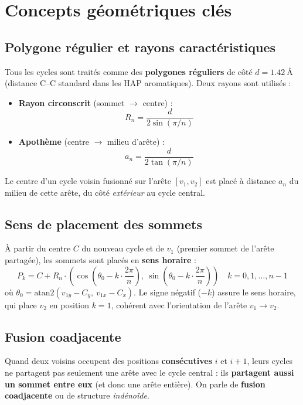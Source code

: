 \documentclass[a4paper,12pt]{article}
\begin{document}
\section{Concepts géométriques clés}

\subsection{Polygone régulier et rayons caractéristiques}

Tous les cycles sont traités comme des \textbf{polygones réguliers} de côté $d = 1.42\ \text{\AA}$
(distance C--C standard dans les HAP aromatiques). Deux rayons sont utilisés :

\begin{itemize}
  \item \textbf{Rayon circonscrit} (sommet $\to$ centre) :
    \[
      R_n = \frac{d}{2 \sin(\pi/n)}
    \]
  \item \textbf{Apothème} (centre $\to$ milieu d'arête) :
    \[
      a_n = \frac{d}{2 \tan(\pi/n)}
    \]
\end{itemize}

Le centre d'un cycle voisin fusionné sur l'arête $[v_1, v_2]$ est placé à distance $a_n$ du
milieu de cette arête, du côté \textit{extérieur} au cycle central.

\subsection{Sens de placement des sommets}

À partir du centre $C$ du nouveau cycle et de $v_1$ (premier sommet de l'arête partagée),
les sommets sont placés en \textbf{sens horaire} :
\[
  P_k = C + R_n \cdot \left(\cos\left(\theta_0 - k \cdot \frac{2\pi}{n}\right),\
                             \sin\left(\theta_0 - k \cdot \frac{2\pi}{n}\right)\right)
  \quad k = 0, 1, \ldots, n-1
\]
où $\theta_0 = \text{atan2}(v_{1y} - C_y,\ v_{1x} - C_x)$. Le signe négatif ($-k$) assure
le sens horaire, qui place $v_2$ en position $k=1$, cohérent avec l'orientation de l'arête
$v_1 \to v_2$.

\subsection{Fusion coadjacente}

Quand deux voisins occupent des positions \textbf{consécutives} $i$ et $i+1$, leurs cycles ne
partagent pas seulement une arête avec le cycle central : ils \textbf{partagent aussi un sommet
entre eux} (et donc une arête entière). On parle de \textbf{fusion coadjacente} ou de structure
\textit{indénoïde}.
\end{document}
